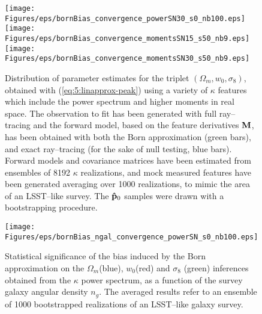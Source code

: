 % 
\begin{figure}
\begin{center}
\texttt{[image: Figures/eps/bornBias\_convergence\_powerSN30\_s0\_nb100.eps]}
\texttt{[image: Figures/eps/bornBias\_convergence\_momentsSN15\_s50\_nb9.eps]}
\texttt{[image: Figures/eps/bornBias\_convergence\_momentsSN30\_s50\_nb9.eps]}
\end{center}
\caption{Distribution of parameter estimates for the triplet $(\Omega_m,w_0,\sigma_8)$, obtained with (\ref{eq:5:linapprox-peak}) using a variety of $\kappa$ features which include the power spectrum and higher moments in real space. The observation to fit has been generated with full ray--tracing and the forward model, based on the feature derivatives $\mathbf{M}$, has been obtained with both the Born approximation (green bars), and exact ray--tracing (for the sake of null testing, blue bars). Forward models and covariance matrices have been estimated from ensembles of 8192 $\kappa$ realizations, and  mock measured features have been generated averaging over 1000 realizations, to mimic the area of an LSST--like survey. The $\mathbf{\hat{p}}_0$ samples were drawn with a bootstrapping procedure.}
\label{fig:7:biasfeat}
\end{figure}
%
\begin{figure}
\begin{center}
\texttt{[image: Figures/eps/bornBias\_ngal\_convergence\_powerSN\_s0\_nb100.eps]}
\end{center}
\caption{Statistical significance of the bias induced by the Born approximation on the $\Omega_m$(blue), $w_0$(red) and  $\sigma_8$ (green) inferences obtained from the $\kappa$ power spectrum, as a function of the survey galaxy angular density $n_g$. The averaged results refer to an ensemble of 1000 bootstrapped realizations of an LSST--like galaxy survey.}
\label{fig:7:biasbornngal}
\end{figure}
%
